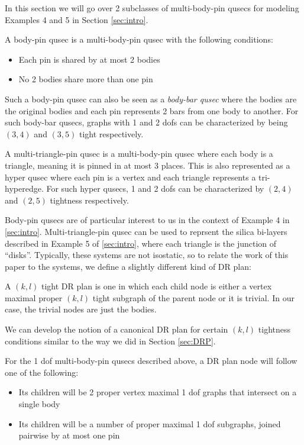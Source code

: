 In this section we will go over 2 subclasses of multi-body-pin qusecs for modeling Examples 4 and 5 in Section \ref{sec:intro}.

\begin{definition}
    A body-pin qusec is a multi-body-pin qusec with the following conditions:
    \begin{itemize}
        \item Each pin is shared by at most 2 bodies
        \item No 2 bodies share more than one pin
    \end{itemize}
    Such a body-pin qusec can also be seen as a {\em body-bar qusec} where the bodies are the original bodies and each pin represents 2 bars from one body to another. For such body-bar qusecs, graphs with 1 and 2 dofs can be characterized by being $(3,4)$ and $(3,5)$ tight respectively.
\end{definition}

\begin{definition}
    A multi-triangle-pin qusec is a multi-body-pin qusec where each body is a triangle, meaning it is pinned in at most 3 places. This is also represented as a hyper qusec where each pin is a vertex and each triangle represents a tri-hyperedge. For such hyper qusecs, 1 and 2 dofs can be characterized by $(2,4)$ and $(2,5)$ tightness respectively.
\end{definition}

Body-pin qusecs are of particular interest to us in the context of Example 4 in \ref{sec:intro}. Multi-triangle-pin qusec can be used to reprsent the silica bi-layers described in Example 5 of \ref{sec:intro}, where each triangle is the junction of ``disks''. Typically, these systems are not isostatic, so to relate the work of this paper to the systems, we define a slightly different kind of DR plan:

\begin{definition}
    A $(k,l)$ tight DR plan is one in which each child node is either a vertex maximal proper $(k,l)$ tight subgraph of the parent node or it is trivial. In our case, the trivial nodes are just the bodies.
\end{definition}

We can develop the notion of a canonical DR plan for certain $(k,l)$ tightness conditions similar to the way we did in Section \ref{sec:DRP}.

\begin{remark}
\label{rem:1dofcanon}
    For the 1 dof multi-body-pin qusecs described above, a DR plan node will follow one of the following:

    \begin{itemize}
        \item Its children will be 2 proper vertex maximal 1 dof graphs that intersect on a single body
        \item Its children will be a number of proper maximal 1 dof subgraphs, joined pairwise by at most one pin
    \end{itemize}
\end{remark}

